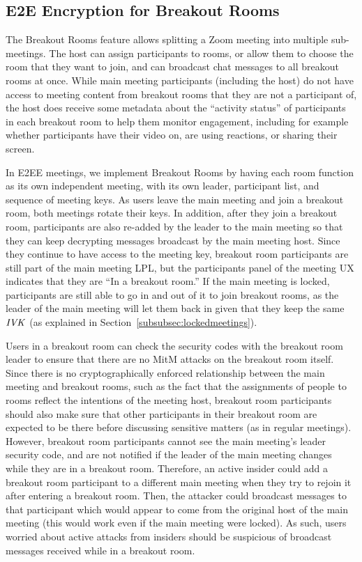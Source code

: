 \subsection{E2E Encryption for Breakout Rooms}
\label{subsec:bor}
The Breakout Rooms feature allows splitting a Zoom meeting into multiple sub-meetings. The host can
assign participants to rooms, or allow them to choose the room that they want to join, and can
broadcast chat messages to all breakout rooms at once. While main meeting participants (including
the host) do not have access to meeting content from breakout rooms that they are not a participant
of, the host does receive some metadata about the ``activity status'' of participants in each
breakout room to help them monitor engagement, including for example whether participants have their
video on, are using reactions, or sharing their screen.

In E2EE meetings, we implement Breakout Rooms by having each room function as its own independent
meeting, with its own leader, participant list, and sequence of meeting keys. As users leave the
main meeting and join a breakout room, both meetings rotate their keys. In addition, after they join
a breakout room, participants are also re-added by the leader to the main meeting so that they can
keep decrypting messages broadcast by the main meeting host. Since they continue to have access to
the meeting key, breakout room participants are still part of the main meeting LPL, but the
participants panel of the meeting UX indicates that they are ``In a breakout room.'' If the main
meeting is locked, participants are still able to go in and out of it to join breakout rooms, as the
leader of the main meeting will let them back in given that they keep the same $\mathit{IVK}$ (as explained
in Section~\ref{subsubsec:lockedmeetings}). 

Users in a breakout room can check the security codes with the breakout room leader to ensure that
there are no MitM attacks on the breakout room itself. Since there is no cryptographically enforced
relationship between the main meeting and breakout rooms, such as the fact that the assignments of
people to rooms reflect the intentions of the meeting host, breakout room participants should also
make sure that other participants in their breakout room are expected to be there before discussing
sensitive matters (as in regular meetings). However, breakout room participants cannot see the main
meeting's leader security code, and are not notified if the leader of the main meeting changes while
they are in a breakout room. Therefore, an active insider could add a breakout room participant to a
different main meeting when they try to rejoin it after entering a breakout room. Then, the attacker
could broadcast messages to that participant which would appear to come from the original host of
the main meeting (this would work even if the main meeting were locked). As such, users worried
about active attacks from insiders should be suspicious of broadcast messages received while in a
breakout room. 

